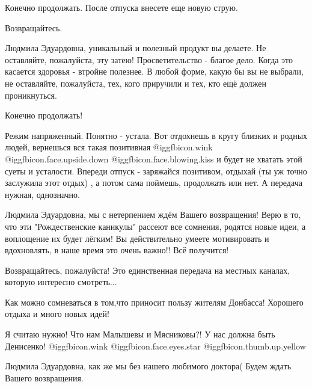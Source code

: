 \begin{itemize}
Конечно продолжать. После отпуска внесете еще новую струю.

Возвращайтесь.


Людмила Эдуардовна, уникальный и полезный продукт вы делаете. Не оставляйте,
пожалуйста, эту затею! Просветительство - благое дело. Когда это касается
здоровья - втройне полезнее. В любой форме, какую бы вы не выбрали, не
оставляйте, пожалуйста, тех, кого приручили и тех, кто ещё должен проникнуться.

Конечно продолжать!


Режим напряженный. Понятно - устала. Вот отдохнешь в кругу близких и родных
людей, вернешься вся такая позитивная  @igg{fbicon.wink}  @igg{fbicon.face.upside.down}  @igg{fbicon.face.blowing.kiss}  и будет не хватать этой суеты и
усталости. Впереди отпуск - заряжайся позитивом, отдыхай (ты уж точно заслужила
этот отдых) , а потом сама поймешь, продолжать или нет. А передача нужная,
однозначно.



Людмила Эдуардовна, мы с нетерпением ждём Вашего возвращения! Верю в то, что
эти "Рождественские каникулы" рассеют все сомнения, родятся новые идеи, а
воплощение их будет лёгким! Вы действительно умеете мотивировать и вдохновлять,
в наше время это очень важно!! Всё получится!


Возвращайтесь, пожалуйста! Это единственная передача на местных каналах,
которую интересно смотреть...


Как можно сомневаться в том,что приносит пользу жителям Донбасса!
Хорошего отдыха и много новых идей!


Я считаю нужно! Что нам Малышевы и Мясниковы?! У нас должна быть Денисенко!
@igg{fbicon.wink}   @igg{fbicon.face.eyes.star}  @igg{fbicon.thumb.up.yellow} 

Людмила Эдуардовна, как же мы без нашего любимого доктора( Будем ждать Вашего возвращения.

\begin{itemize} %



\end{itemize}
\end{itemize}
